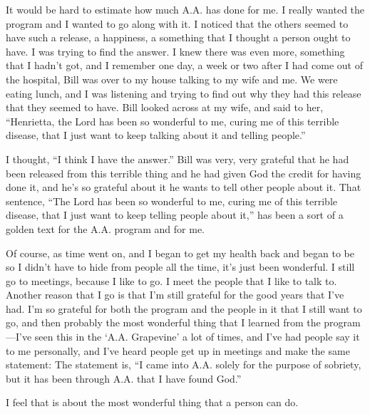 \begin{biblechapter}
It would be hard to estimate how much A.A. has done for me. I really wanted the program and I wanted to go along with it. I noticed that the others seemed to have such a release, a happiness, a something that I thought a person ought to have. I was trying to find the answer. I knew there was even more, something that I hadn’t got, and I remember one day, a week or two after I had come out of the hospital, Bill was over to my house talking to my wife and me. We were eating lunch, and I was listening and trying to find out why they had this release that they seemed to have. Bill looked across at my wife, and said to her, “Henrietta, the Lord has been so wonderful to me, curing me of this terrible disease, that I just want to keep talking about it and telling people.”

I thought, “I think I have the answer.” Bill was very, very grateful that he had been released from this terrible thing and he had given God the credit for having done it, and he’s so grateful about it he wants to tell other people about it. That sentence, “The Lord has been so wonderful to me, curing me of this terrible disease, that I just want to keep telling people about it,” has been a sort of a golden text for the A.A. program and for me.

       Of course, as time went on, and I began to get my health back and began to be so I didn’t have to hide from people all the time, it’s just been wonderful. I still go to meetings, because I like to go. I meet the people that I like to talk to. Another reason that I go is that I’m still grateful for the good years that I’ve had. I’m so grateful for both the program and the people in it that I still want to go, and then probably the most wonderful thing that I learned from the program—I’ve seen this in the ‘A.A. Grapevine’ a lot of times, and I’ve had people say it to me personally, and I’ve heard people get up in meetings and make the same statement: The statement is, “I came into A.A. solely for the purpose of sobriety, but it has been through A.A. that I have found God.”

I feel that is about the most wonderful thing that a person can do.

\end{biblechapter}
